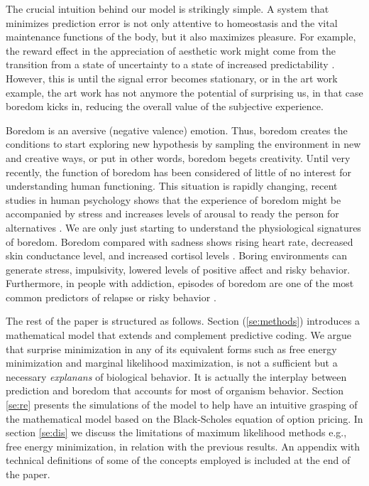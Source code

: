 \documentclass[11pt,twocolumn]{article}
\begin{document}
The crucial intuition behind our model is strikingly simple.
A system that minimizes prediction error is not only attentive to homeostasis and the vital maintenance functions of the body, but it also maximizes pleasure. For example, the reward effect in the appreciation of aesthetic work might come from the transition from a state of uncertainty to a state of increased predictability \citep{van_de_cruys_putting_2011}.
However, this is until the signal error becomes stationary, or in the art work example, the art work has not anymore the potential of surprising us, in that case boredom kicks in, reducing the overall value of the subjective experience.

Boredom is an aversive (negative valence) emotion. Thus, boredom creates the conditions to start exploring new hypothesis by sampling the environment in new and creative ways, or put in other words, boredom begets creativity. 
Until very recently, the function of boredom has been considered of little of no interest for understanding human functioning. This situation is rapidly changing, 
recent studies in human psychology shows that the experience of boredom might be accompanied by stress and increases levels of arousal to ready the person for alternatives \citep{posner_neurophysiological_2009} \citep{bench_function_2013}. We are only just starting to understand the physiological signatures of boredom. Boredom compared with sadness shows rising heart rate, decreased skin conductance level, and increased cortisol levels  \citep{merrifield_characterizing_2014}. Boring environments can generate stress, impulsivity, lowered levels of positive affect and risky behavior. Furthermore, in people with addiction, episodes of  boredom are one of the most common predictors of relapse or risky behavior \citep{blaszczynski_boredom_1990}.

The rest of the paper is structured as follows. Section (\ref{se:methods})  introduces a mathematical model that extends and complement predictive coding. We argue that surprise minimization in any of its equivalent forms such as free energy minimization and marginal likelihood maximization, is not a sufficient but a necessary \emph{explanans} of biological behavior. It is actually the interplay between prediction and boredom that accounts for most of organism behavior. Section \ref{se:re} presents the simulations of the model to help have an intuitive grasping of the mathematical model based on the Black-Scholes equation of option pricing.
In section \ref{se:dis} we discuss the limitations of maximum likelihood methods e.g., free energy minimization, in relation with the previous results. An appendix with technical definitions of some of the concepts employed is included at the end of the paper.
\end{document}
